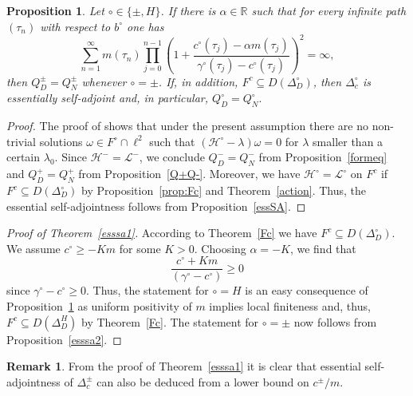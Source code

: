 \documentclass[10pt]{amsart}
\newtheorem{proposition}[theorem]{Proposition}
\theoremstyle{definition}
\newtheorem*{remark}{Remark}
\newcommand{\F}{{F}}
\renewcommand{\bullet}{{\circ}}
\begin{document}
\begin{proposition}\label{measureEss}Let $\bullet\in\{\pm,H\}$.
 If there is $\alpha\in\mathbb{R}$ such that for every infinite path $(\tau_n)$ with respect to $b^{\bullet}$  one has
	$$\sum_{n = 1}^{\infty}m(\tau_n)\prod_{j = 0}^{n-1}\left(1+\frac{c^\bullet(\tau_j)-\alpha m(\tau_j)}{\gamma^\bullet(\tau_j)-c^\bullet(\tau_j)} \right)^2 = \infty,$$ then $Q^{\pm}_{D}=Q^{\pm}_{N}$ whenever $\bullet=\pm$. If, in addition, $\F^c\subseteq D(\Delta^\bullet_D)$, then $\Delta^\bullet_{c}$ is essentially self-adjoint and, in particular, $Q^{\bullet}_{D}=Q^{\bullet}_{N}.$
\end{proposition}
\begin{proof}
	The proof of \cite[Theorem 2.14]{GKS} shows that under the present assumption there are no non-trivial solutions $\omega \in F^{\bullet}\cap \ell^{2}$ such that $(\mathcal{H}^{\bullet}-\lambda)\omega=0$ for $\lambda$ smaller than a certain $\lambda_{0}$. Since $\mathcal{H}^{-}=\mathcal{L}^{-}$, we conclude $Q^{-}_{D}=Q^{-}_{N}$ from Proposition~\ref{formeq} and $Q^{+}_{D}=Q^{+}_{N}$ from Proposition~\ref{Q+Q-}. Moreover, we have $\mathcal{H}^{\bullet}=\mathcal{L}^{\bullet}$ on $F^{c}$ if $ \F^c\subseteq D(\Delta^\bullet_D)$ by Proposition~\ref{prop:Fc} and Theorem~\ref{action}. Thus, the essential self-adjointness follows from Proposition~\ref{essSA}.
\end{proof}


\begin{proof}[Proof of Theorem~\ref{esssa1}]
	According to Theorem~\ref{Fc} we have $\F^c\subseteq D(\Delta^\bullet_D).$ We assume $c^\bullet \ge -Km$ for some $K>0$. Choosing $\alpha=-K$, we find that 
	$$\frac{c^\bullet+Km }{(\gamma^\bullet-c^\bullet)}  \ge0$$
	since $\gamma^\bullet-c^\bullet \ge0$. 
	 Thus, the statement for $\bullet=H$ is an easy consequence of Proposition~\ref{measureEss} as uniform positivity of $m$ implies local finiteness and, thus, $F^{c}\subseteq D(\Delta^{H}_{D})$ by Theorem~\ref{Fc}. The statement for $\bullet=\pm$ now follows from Proposition~\ref{esssa2}.
\end{proof}

\begin{remark}
	From the proof of Theorem~\ref{esssa1} it is clear that essential self-adjointness of $\Delta^{\pm}_{c}$ can also be deduced from a lower bound on $c^{\pm}/m$.
\end{remark}
\end{document}
